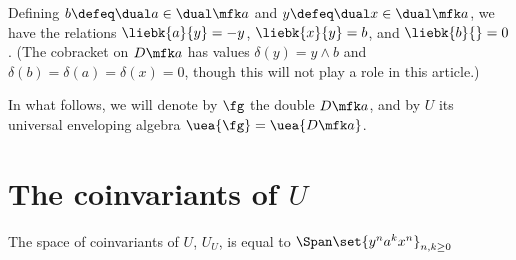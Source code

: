 \documentclass{article}
\begin{document}
Defining $b \defeq \dual a \in \dual\fa$ and $y \defeq \dual x \in \dual\fa$, we
have the relations $\liebk{a}{y}=-y$, $\liebk{x}{y}=b$, and $\liebk{b}{}=0$.
(The cobracket on $D\fa$ has values $δ(y) = y \wedge b$ and $δ(b) =
δ(a) = δ(x) = 0$, though this will not play a role in this article.)

In what follows, we will denote by $\fg$ the double $D\fa$, and by $U$ its
universal enveloping algebra $\uea{\fg} = \uea{D\fa}$.

\section{The coinvariants of $U$}

\begin{theorem}
        The space of coinvariants of $U$, $U_U$, is equal to
        $\Span\set{y^n a^k x^n}_{n, k\ge 0}$
\end{theorem}
\end{document}
